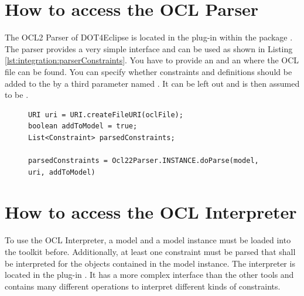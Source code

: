 \section{How to access the OCL Parser}
The \acs{OCL}2 Parser of \acl{DOT4Eclipse} is located in the plug-in 
 within
the package
.
The parser provides a very simple interface and can be used as shown in Listing
\ref{lst:integration:parserConstraints}. You have to provide an 
and an  where the \acs{OCL} file can be found. You can specify whether
constraints and definitions should be added to the  by a third
parameter named . It can be left out and is then assumed to be
.

\begin{figure}[!b]
\begin{lstlisting}[caption={How to parse constraints.}, captionpos=b, label=lst:integration:parserConstraints]
URI uri = URI.createFileURI(oclFile);
boolean addToModel = true;
List<Constraint> parsedConstraints;

parsedConstraints = Ocl22Parser.INSTANCE.doParse(model, uri, addToModel)
\end{lstlisting}
\end{figure}



\section{How to access the OCL Interpreter}

To use the \acs{OCL} Interpreter, a model and a model instance must be loaded 
into the toolkit before. Additionally, at least one constraint must be parsed 
that shall be interpreted for the objects contained in the model instance. The 
interpreter is located in the plug-in 
. It has a more 
complex interface than the other tools and contains many different operations 
to interpret different kinds of constraints.

